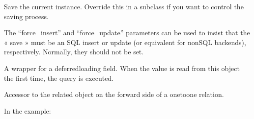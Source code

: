 \documentclass[letterpaper,10pt,french]{sphinxmanual}
\begin{document}
\begin{fulllineitems}
\begin{fulllineitems}
\label{\detokenize{main/model:main.models.Personnel.save}}
\pysigstartsignatures
{}
\pysigstopsignatures
\sphinxAtStartPar
Save the current instance. Override this in a subclass if you want to
control the saving process.

\sphinxAtStartPar
The “force\_insert” and “force\_update” parameters can be used to insist
that the « save » must be an SQL insert or update (or equivalent for
non\sphinxhyphen{}SQL backends), respectively. Normally, they should not be set.

\end{fulllineitems}


\begin{fulllineitems}
\label{\detokenize{main/model:main.models.Personnel.sexe}}
\pysigstartsignatures
{}
\pysigstopsignatures
\sphinxAtStartPar
A wrapper for a deferred\sphinxhyphen{}loading field. When the value is read from this
object the first time, the query is executed.

\end{fulllineitems}


\begin{fulllineitems}
\label{\detokenize{main/model:main.models.Personnel.update_conge_counts}}
\pysigstartsignatures
{}
\pysigstopsignatures
\end{fulllineitems}


\begin{fulllineitems}
\label{\detokenize{main/model:main.models.Personnel.user}}
\pysigstartsignatures
{}
\pysigstopsignatures
\sphinxAtStartPar
Accessor to the related object on the forward side of a one\sphinxhyphen{}to\sphinxhyphen{}one relation.

\sphinxAtStartPar
In the example:


\end{fulllineitems}
\end{fulllineitems}
\end{document}
